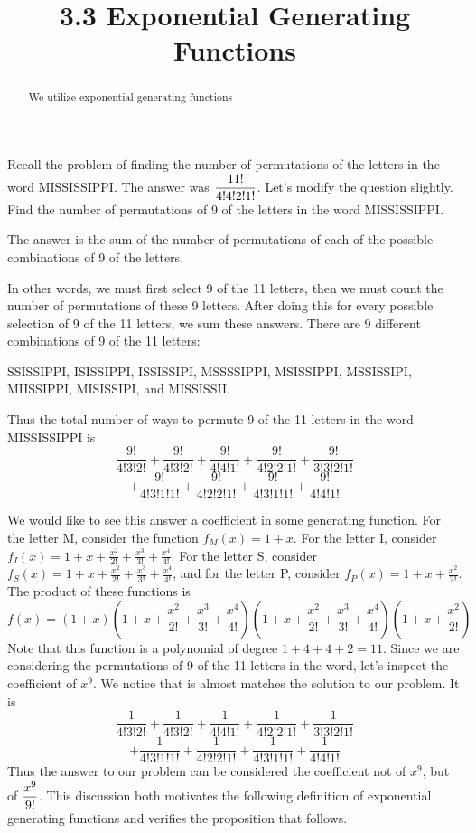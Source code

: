 \documentclass[handout]{ximera}
\title{3.3 Exponential Generating Functions}
\begin{document}
\begin{abstract}
We utilize exponential generating functions
\end{abstract}

\maketitle

Recall the problem of finding the number of permutations of the letters in the word MISSISSIPPI. The answer was $\displaystyle \frac{11!}{4!4!2!1!}$.
Let's modify the question slightly.  Find the number of permutations of 9 of the letters in the word MISSISSIPPI. 

The answer is the sum of the number of permutations of each of the possible combinations of 9 of the letters.

In other words, we must first select 9 of the 11 letters, then we must count the number of permutations of these 9 letters.  
After doing this for every possible selection of 9 of the 11 letters, we sum these answers.
There are 9 different combinations of 9 of the 11 letters:\\
\begin{center}
SSISSIPPI, ISISSIPPI, ISSISSIPI, MSSSSIPPI, MSISSIPPI, MSSISSIPI, MIISSIPPI, MISISSIPI, and MISSISSII.\\
\end{center}
Thus the total number of ways to permute 9 of the 11 letters in the word MISSISSIPPI is
\[
\frac{9!}{4!3!2!} + \frac{9!}{4!3!2!} + \frac{9!}{4!4!1!} + \frac{9!}{4!2!2!1!} + \frac{9!}{3!3!2!1!} 
\]
\[
+ \frac{9!}{4!3!1!1!} + \frac{9!}{4!2!2!1!} + \frac{9!}{4!3!1!1!} + \frac{9!}{4!4!1!}
\]
 
We would like to see this answer a coefficient in some generating function.
For the letter M, consider the function $f_M(x) = 1+x$. For the letter I, 
consider $f_I(x) = 1 + x + \frac{x^2}{2!} + \frac{x^3}{3!} + \frac{x^4}{4!}$.
For the letter S, consider $f_S(x) = 1 + x + \frac{x^2}{2!} + \frac{x^3}{3!} + \frac{x^4}{4!}$,
and for the letter P, consider $f_P(x) = 1 + x + \frac{x^2}{2!}$.
The product of these functions is
\[
f(x) = \left(1+x\right)\left(1+x+\frac{x^2}{2!} + \frac{x^3}{3!} + \frac{x^4}{4!}\right)
\left(1+x+\frac{x^2}{2!} + \frac{x^3}{3!} + \frac{x^4}{4!}\right)
\left(1+x+\frac{x^2}{2!}\right)
\]
Note that this function is a polynomial of degree $1+4+4+2 = 11$. 
Since we are considering the permutations of 9 of the 11 letters in the word, let's inspect the coefficient of $x^9$.
We notice that is almost matches the solution to our problem. It is
\[
\frac{1}{4!3!2!} + \frac{1}{4!3!2!} + \frac{1}{4!4!1!} + \frac{1}{4!2!2!1!} + \frac{1}{3!3!2!1!} 
\]
\[
+ \frac{1}{4!3!1!1!} + \frac{1}{4!2!2!1!} + \frac{1}{4!3!1!1!} + \frac{1}{4!4!1!}
\]
Thus the answer to our problem can be considered the coefficient not of $x^9$, but of $\displaystyle \frac{x^9}{9!}$. 
This discussion both motivates the following definition of exponential
generating functions and verifies the proposition that follows.
\end{document}

